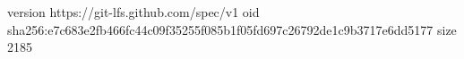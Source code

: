 version https://git-lfs.github.com/spec/v1
oid sha256:e7c683e2fb466fc44c09f35255f085b1f05fd697c26792de1c9b3717e6dd5177
size 2185
